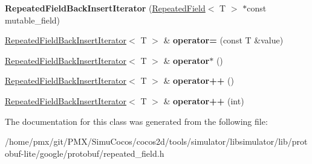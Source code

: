 \begin{DoxyCompactItemize}
{\bfseries Repeated\+Field\+Back\+Insert\+Iterator} (\hyperlink{classgoogle_1_1protobuf_1_1RepeatedField}{Repeated\+Field}$<$ T $>$ $\ast$const mutable\+\_\+field)
\item 
\mbox{\label{classgoogle_1_1protobuf_1_1internal_1_1RepeatedFieldBackInsertIterator_a8b98c2c3c502fdb4b7e6ada0ad9516c9}} 
\hyperlink{classgoogle_1_1protobuf_1_1internal_1_1RepeatedFieldBackInsertIterator}{Repeated\+Field\+Back\+Insert\+Iterator}$<$ T $>$ \& {\bfseries operator=} (const T \&value)
\item 
\mbox{\label{classgoogle_1_1protobuf_1_1internal_1_1RepeatedFieldBackInsertIterator_aee3e0541f34bd73860f7935affff81d5}} 
\hyperlink{classgoogle_1_1protobuf_1_1internal_1_1RepeatedFieldBackInsertIterator}{Repeated\+Field\+Back\+Insert\+Iterator}$<$ T $>$ \& {\bfseries operator$\ast$} ()
\item 
\mbox{\label{classgoogle_1_1protobuf_1_1internal_1_1RepeatedFieldBackInsertIterator_a3302b8e4611bbd024ba6deb1496d55a7}} 
\hyperlink{classgoogle_1_1protobuf_1_1internal_1_1RepeatedFieldBackInsertIterator}{Repeated\+Field\+Back\+Insert\+Iterator}$<$ T $>$ \& {\bfseries operator++} ()
\item 
\mbox{\label{classgoogle_1_1protobuf_1_1internal_1_1RepeatedFieldBackInsertIterator_a64f83518c3fc29efb8af4f9764625c57}} 
\hyperlink{classgoogle_1_1protobuf_1_1internal_1_1RepeatedFieldBackInsertIterator}{Repeated\+Field\+Back\+Insert\+Iterator}$<$ T $>$ \& {\bfseries operator++} (int)
\end{DoxyCompactItemize}


The documentation for this class was generated from the following file\+:\begin{DoxyCompactItemize}
\item 
/home/pmx/git/\+P\+M\+X/\+Simu\+Cocos/cocos2d/tools/simulator/libsimulator/lib/protobuf-\/lite/google/protobuf/repeated\+\_\+field.\+h\end{DoxyCompactItemize}

